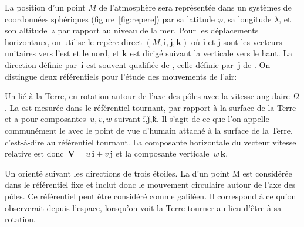 \sk
La position d'un point $M$ de l'atmosphère sera représentée dans un systèmes de coordonnées sphériques (figure~\ref{fig:repere}) par sa latitude $\varphi$, sa longitude $\lambda$, et son altitude~$z$ par rapport au niveau de la mer. Pour les déplacements horizontaux, on utilise le repère direct
$\left(M,\mathbf{i},\mathbf{j},\mathbf{k}\right)$ où $\mathbf{i}$ et $\mathbf{j}$ sont les vecteurs unitaires vers l'est et le nord, et $\mathbf{k}$ est dirigé suivant la verticale vers le haut. La direction définie par~$\mathbf{i}$ est souvent qualifiée de , celle définie par~$\mathbf{j}$ de . 
%
On distingue deux référentiels pour l'étude des mouvements de l'air:
\begin{finger}
\item Un  lié à la Terre, en rotation autour de l'axe des pôles avec la vitesse angulaire $\Omega$. La  est mesurée dans le référentiel tournant, par rapport à la surface de la Terre et a pour composantes~$u,v,w$ suivant \v i,\v j,\v k. Il s'agit de ce que l'on appelle communément le  avec le point de vue d'humain attaché à la surface de la Terre, c'est-à-dire au référentiel tournant. La composante horizontale du vecteur vitesse relative est donc~$\mathbf{V} = u \, \mathbf{i} + v \, \mathbf{j}$ et la composante verticale~$w \, \mathbf{k}$.
\item Un  orienté suivant les directions de trois étoiles. La  d'un point M est considérée dans le référentiel fixe et inclut donc le mouvement circulaire autour de l'axe des pôles. Ce référentiel peut être considéré comme galiléen. Il correspond à ce qu'on observerait depuis l'espace, lorsqu'on voit la Terre tourner au lieu d'être  à sa rotation.
\end{finger}




